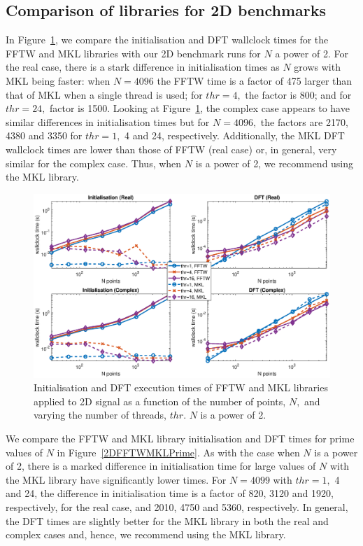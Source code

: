 \documentclass[a4paper]{article}
\begin{document}
\subsection{Comparison of libraries for 2D benchmarks}\label{Sec:2DComp}

In Figure~\ref{2DFFTWMKL2}, we compare the initialisation and DFT
wallclock times for the FFTW and MKL libraries with our 2D benchmark
runs for $N$ a power of 2. For the real case, there is a stark
difference in initialisation times as $N$ grows with MKL being faster:
when $N=4096$ the FFTW time is a factor of 475 larger than that of MKL
when a single thread is used; for $thr=4,$ the factor is 800; and for
$thr=24,$ factor is 1500. Looking at Figure~\ref{2DFFTWMKL2}, the
complex case appears to have similar differences in initialisation
times but for $N=4096,$ the factors are 2170, 4380 and 3350 for
$thr=1,$ 4 and 24, respectively. Additionally, the MKL DFT wallclock
times are lower than those of FFTW (real case) or, in general, very
similar for the complex case. Thus, when $N$ is a power of 2, we
recommend using the MKL library.


\begin{figure}[htb]
    \centering
    \includegraphics[width=0.9\linewidth]{../results/fftw_mkl_2_2d_thr.eps}
  \caption{Initialisation and DFT execution times of FFTW and MKL libraries applied to 2D signal as a function of the
    number of points, $N,$ and varying the number of threads, $thr.$ $N$ is a power of 2.}
  \label{2DFFTWMKL2}
\end{figure}


We compare the FFTW and MKL library initialisation and DFT times for
prime values of $N$ in Figure~\ref{2DFFTWMKLPrime}. As with the case
when $N$ is a power of 2, there is a marked difference in
initialisation time for large values of $N$ with the MKL library have
significantly lower times. For $N=4099$ with $thr=1,$ 4 and 24, the
difference in initialisation time is a factor of 820, 3120 and 1920,
respectively, for the real case, and 2010, 4750 and 5360,
respectively. In general, the DFT times are slightly better for the
MKL library in both the real and complex cases and, hence, we
recommend using the MKL library.
\end{document}

